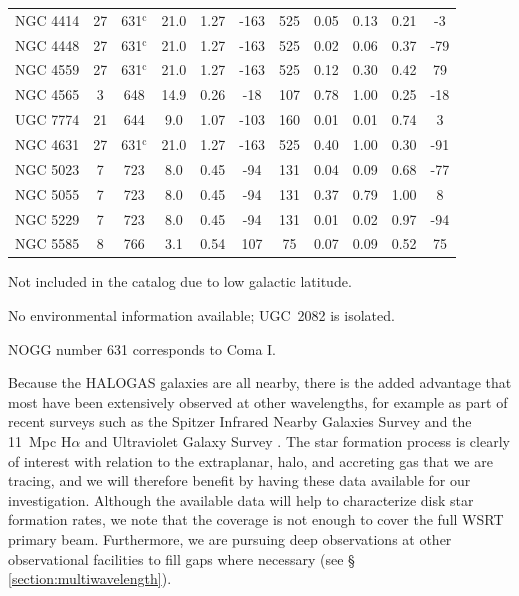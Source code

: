 \documentclass[oldversion]{aa}
\begin{document}
\begin{table}
\begin{tabular}{lcccccccccc}
NGC 4414              & 27  & 631$^\mathrm{c}$ & 21.0 & 1.27 & -163 & 525 & 0.05 & 0.13 & 0.21 & -3 \\
NGC 4448              & 27  & 631$^\mathrm{c}$ & 21.0 & 1.27 & -163 & 525 & 0.02 & 0.06 & 0.37 & -79 \\
NGC 4559              & 27  & 631$^\mathrm{c}$ & 21.0 & 1.27 & -163 & 525 & 0.12 & 0.30 & 0.42 & 79 \\
NGC 4565              & 3   & 648              & 14.9 & 0.26 & -18  & 107 & 0.78 & 1.00 & 0.25 & -18 \\
UGC 7774              & 21  & 644              & 9.0  & 1.07 & -103 & 160 & 0.01 & 0.01 & 0.74 & 3 \\
NGC 4631              & 27  & 631$^\mathrm{c}$ & 21.0 & 1.27 & -163 & 525 & 0.40 & 1.00 & 0.30 & -91 \\
NGC 5023              & 7   & 723              & 8.0  & 0.45 & -94  & 131 & 0.04 & 0.09 & 0.68 & -77 \\
NGC 5055              & 7   & 723              & 8.0  & 0.45 & -94  & 131 & 0.37 & 0.79 & 1.00 & 8 \\
NGC 5229              & 7   & 723              & 8.0  & 0.45 & -94  & 131 & 0.01 & 0.02 & 0.97 & -94 \\
NGC 5585              & 8   & 766              & 3.1  & 0.54 & 107  & 75  & 0.07 & 0.09 & 0.52 & 75 \\
\hline
\end{tabular}
\begin{list}{}{}
\item[$^\mathrm{a}$] Not included in the \citet{giuricin_etal_2000} catalog due to low galactic latitude.
\item[$^\mathrm{b}$] No environmental information available; UGC~2082 is isolated.
\item[$^\mathrm{c}$] NOGG number 631 corresponds to Coma I.
\end{list}
\end{table}

Because the HALOGAS galaxies are all nearby, there is the added advantage that most have been extensively observed at other wavelengths, for example as part of recent surveys such as the Spitzer Infrared Nearby Galaxies Survey \citep[SINGS;][]{kennicutt_etal_2003} and the 11~Mpc H$\alpha$ and Ultraviolet Galaxy Survey \citep[11HUGS;][]{lee_etal_2007}. The star formation process is clearly of interest with relation to the extraplanar, halo, and accreting gas that we are tracing, and we will therefore benefit by having these data available for our investigation. Although the available data will help to characterize disk star formation rates, we note that the coverage is not enough to cover the full WSRT primary beam. Furthermore, we are pursuing deep observations at other observational facilities to fill gaps where necessary (see \S\,\ref{section:multiwavelength}).
\end{document}
